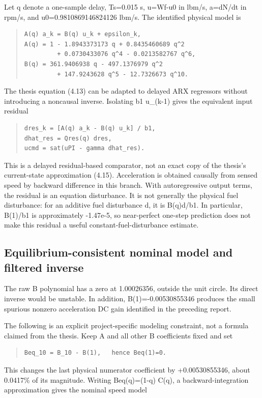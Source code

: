Let q denote a one-sample delay, Ts=0.015 s, u=Wf-u0 in lbm/s,
a=dN/dt in rpm/s, and u0=0.9810869146824126 lbm/s. The identified physical model is

\begin{quote}\footnotesize
\begin{verbatim}
A(q) a_k = B(q) u_k + epsilon_k,
A(q) = 1 - 1.8943373173 q + 0.8435460689 q^2
         + 0.0730433076 q^4 - 0.0213582767 q^6,
B(q) = 361.9406938 q - 497.1376979 q^2
         + 147.9243628 q^5 - 12.7326673 q^10.
\end{verbatim}
\end{quote}
The thesis equation (4.13) can be adapted to delayed ARX regressors without
introducing a noncausal inverse. Isolating b1 u\_\allowbreak (k-1) gives the equivalent input
residual

\begin{quote}\footnotesize
\begin{verbatim}
dres_k = [A(q) a_k - B(q) u_k] / b1,
dhat_res = Qres(q) dres,
ucmd = sat(uPI - gamma dhat_res).
\end{verbatim}
\end{quote}
This is a delayed residual-based comparator, not an exact copy of the thesis's
current-state approximation (4.15). Acceleration is obtained causally from sensed
speed by backward difference in this branch. With autoregressive output terms,
the residual is an equation disturbance. It is not generally the physical fuel
disturbance: for an additive fuel disturbance d, it is B(q)d/b1. In particular,
B(1)/b1 is approximately -1.47e-5, so near-perfect one-step prediction does not
make this residual a useful constant-fuel-disturbance estimate.

\subsection{Equilibrium-consistent nominal model and filtered inverse}

The raw B polynomial has a zero at 1.00026356, outside the unit circle. Its direct
inverse would be unstable. In addition, B(1)=-0.00530855346 produces the small
spurious nonzero acceleration DC gain identified in the preceding report.

The following is an explicit project-specific modeling constraint, not a formula
claimed from the thesis. Keep A and all other B coefficients fixed and set

\begin{quote}\footnotesize
\begin{verbatim}
Beq_10 = B_10 - B(1),   hence Beq(1)=0.
\end{verbatim}
\end{quote}
This changes the last physical numerator coefficient by +0.00530855346, about
0.0417\% of its magnitude. Writing Beq(q)=(1-q) C(q), a backward-integration
approximation gives the nominal speed model

